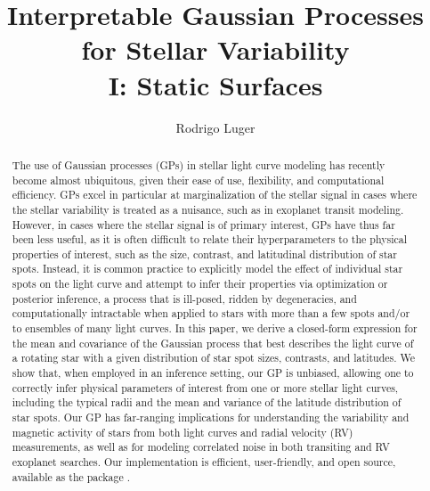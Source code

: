 \documentclass[modern]{aastex62}
\begin{document}
\title{%
    \textbf{
        Interpretable Gaussian Processes for Stellar Variability\\
        I: Static Surfaces
    }
}

\author[0000-0002-0296-3826]{Rodrigo Luger}
%



\begin{abstract}
    The use of Gaussian processes (GPs) in stellar light curve modeling has recently
    become almost ubiquitous, given their ease of use, flexibility, and
    computational efficiency. GPs excel in particular at marginalization
    of the stellar signal in cases where the stellar variability is treated
    as a nuisance, such as in exoplanet transit modeling.
    However, in cases where the stellar signal is of primary interest,
    GPs have thus far been less useful, as it is often difficult to
    relate their hyperparameters to the physical properties of interest, such
    as the size, contrast, and latitudinal distribution of star spots.
    Instead, it is common practice to explicitly model the effect
    of individual star spots on the light curve and attempt to infer their
    properties via optimization or posterior inference, a process that is
    ill-posed, ridden by degeneracies, and computationally intractable when
    applied to stars with more than a few spots and/or to ensembles of many
    light curves.
    In this paper, we derive a closed-form expression for the
    mean and covariance of the Gaussian process that best describes
    the light curve of a rotating star with a given distribution of
    star spot sizes, contrasts, and latitudes.
    We show that, when employed in an inference setting, our GP is unbiased,
    allowing one to correctly infer physical parameters of interest from one
    or more stellar light curves, including
    the typical radii and the mean and variance of the latitude
    distribution of star spots.
    Our GP has far-ranging implications for understanding the variability and
    magnetic activity of stars from both light curves and radial velocity (RV)
    measurements, as well as for modeling correlated noise in both transiting
    and RV exoplanet searches.
    Our implementation is efficient, user-friendly, and open source, available
    as the \Python package \starryprocess.
    \href{https://github.com/rodluger/starry_process}{\color{linkcolor}\faGithub}
\end{abstract}
\end{document}
